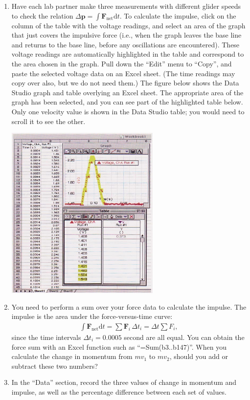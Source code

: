 \begin{enumerate}[label=\arabic*.]
\item Have each lab partner make three measurements with different glider speeds to check the relation \(\Delta\textbf{p} = \int \textbf{F}_{\textrm{net}} \textrm{d}t\).  To calculate the impulse, click on the column of the table with the voltage readings, and select an area of the graph that just covers the impulsive force (i.e., when the graph leaves the base line and returns to the base line, before any oscillations are encountered).  These voltage readings are automatically highlighted in the table and correspond to the area chosen in the graph.  Pull down the ``Edit'' menu to ``Copy'', and paste the selected voltage data on an Excel sheet.  (The time readings may copy over also, but we do not need them.)  The figure below shows the Data Studio graph and table overlying an Excel sheet.  The appropriate area of the graph has been selected, and you can see part of the highlighted table below.  Only one velocity value is shown in the Data Studio table; you would need to scroll it to see the other.
\begin{center} \includegraphics*[width=0.6\textwidth]{imgs/6labs/6Alab/6Aexp5/IMG_002_sm_fx.jpg} \end{center}

\item You need to perform a sum over your force data to calculate the impulse.
	The impulse is the area under the force-versus-time curve:
\begin{align} \int \textbf{F}_{\textrm{net}} \textrm{d}t = \sum \textbf{F}_i \,\Delta t_i = \Delta t \sum F_i, \end{align}
since the time intervals \(\Delta t_i = 0.0005\) second are all equal.  You can obtain the force sum with an Excel function such as ``=Sum(b3..b147)''.  When you calculate the change in momentum from \(mv_1\) to \(mv_2\), should you add or subtract these two numbers?

\item In the ``Data'' section, record the three values of change in momentum and impulse, as well as the percentage difference between each set of values.

\end{enumerate}

